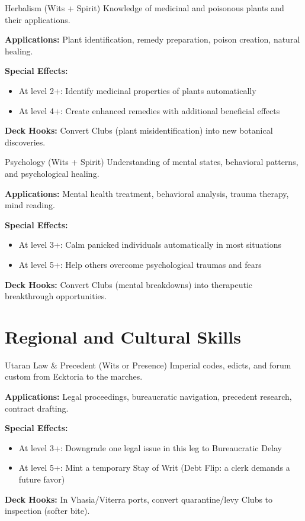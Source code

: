 \documentclass[11pt]{report}
\begin{document}
\begin{skillbox}{Herbalism (Wits + Spirit)}
Knowledge of medicinal and poisonous plants and their applications.

\textbf{Applications:} Plant identification, remedy preparation, poison creation, natural healing.

\textbf{Special Effects:}
\begin{itemize}
    \item At level 2+: Identify medicinal properties of plants automatically
    \item At level 4+: Create enhanced remedies with additional beneficial effects
\end{itemize}

\textbf{Deck Hooks:} Convert Clubs (plant misidentification) into new botanical discoveries.
\end{skillbox}

\begin{skillbox}{Psychology (Wits + Spirit)}
Understanding of mental states, behavioral patterns, and psychological healing.

\textbf{Applications:} Mental health treatment, behavioral analysis, trauma therapy, mind reading.

\textbf{Special Effects:}
\begin{itemize}
    \item At level 3+: Calm panicked individuals automatically in most situations
    \item At level 5+: Help others overcome psychological traumas and fears
\end{itemize}

\textbf{Deck Hooks:} Convert Clubs (mental breakdowns) into therapeutic breakthrough opportunities.
\end{skillbox}

\section{Regional and Cultural Skills}

\begin{skillbox}{Utaran Law \& Precedent (Wits or Presence)}
Imperial codes, edicts, and forum custom from Ecktoria to the marches.

\textbf{Applications:} Legal proceedings, bureaucratic navigation, precedent research, contract drafting.

\textbf{Special Effects:}
\begin{itemize}
    \item At level 3+: Downgrade one legal issue in this leg to Bureaucratic Delay
    \item At level 5+: Mint a temporary Stay of Writ (Debt Flip: a clerk demands a future favor)
\end{itemize}

\textbf{Deck Hooks:} In Vhasia/Viterra ports, convert quarantine/levy Clubs to inspection (softer bite).
\end{skillbox}
\end{document}
